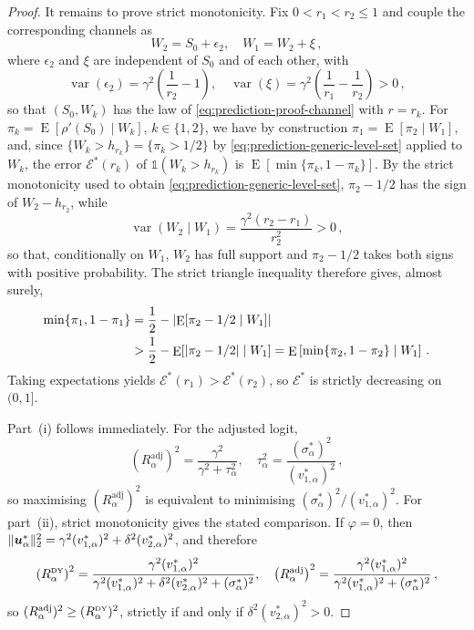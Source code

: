 \documentclass{article}
\makeatletter
\DeclareMathOperator{\expect}{E}
\DeclareMathOperator{\var}{var}
\theoremstyle{definition}
\newcommand{\vnorm}[1]{%
	\ensuremath{%
		\if@display
		\left\| #1 \right\|
		\else
		\| #1 \|
		\fi
	}%
}
\newcommand{\abs}[1]{%
	\ensuremath{%
		\if@display
		\left| #1 \right|
		\else
		\lvert #1 \rvert
		\fi
	}%
}
\newcommand*{\bb}{\boldsymbol}
\def\bu{\bb{u}}
\makeatother
\begin{document}
\begin{bibunit}
\begin{proof}
It remains to prove strict monotonicity. Fix $0<r_1<r_2\leq1$ and couple
the corresponding channels as
$$
    W_2=S_0+\epsilon_2,
    \quad
    W_1=W_2+\xi\,,
$$
where $\epsilon_2$ and $\xi$ are independent of $S_0$ and of each other,
with
$$
    \var(\epsilon_2)
    =
    \gamma^2\left(\frac1{r_2}-1\right),
    \quad
    \var(\xi)
    =
    \gamma^2\left(\frac1{r_1}-\frac1{r_2}\right)>0\,,
$$
so that $(S_0,W_k)$ has the law of \eqref{eq:prediction-proof-channel} with
$r=r_k$. For $\pi_k=\expect[\rho'(S_0)\mid W_k]$,
$k\in\{1,2\}$, we have by construction 
$\pi_1=\expect[\pi_2\mid W_1]$, and, since
$\{W_k>h_{r_k}\}=\{\pi_k>1/2\}$ by
\eqref{eq:prediction-generic-level-set} applied to $W_k$, the error
$\mathcal E^*(r_k)$ of $\mathds 1(W_k>h_{r_k})$ is
$\expect[\min\{\pi_k,1-\pi_k\}]$. By the strict monotonicity used to
obtain \eqref{eq:prediction-generic-level-set}, $\pi_2-1/2$ has the sign
of $W_2-h_{r_2}$, while
$$
    \var(W_2\mid W_1)
    =
    \frac{\gamma^2(r_2-r_1)}{r_2^2}>0\,,
$$
so that, conditionally on $W_1$, $W_2$ has full support and
$\pi_2-1/2$ takes both signs with positive probability. The strict
triangle inequality therefore gives, almost surely,
$$
\begin{aligned}
    \min\{\pi_1,1-\pi_1\}
    &=
    \frac12-\abs{\expect[\pi_2-1/2\mid W_1]}
    \\
    &>
    \frac12-\expect[\abs{\pi_2-1/2}\mid W_1]
    =
    \expect\left[\min\{\pi_2,1-\pi_2\}\mid W_1\right] \,.
\end{aligned}
$$
Taking expectations yields
$\mathcal E^*(r_1)>\mathcal E^*(r_2)$, so $\mathcal E^*$ is strictly
decreasing on $(0,1]$.

Part~(i) follows immediately. For the adjusted logit,
$$
    (R_\alpha^{\mathrm{adj}})^2
    =
    \frac{\gamma^2}{\gamma^2+\tau_\alpha^2},
    \quad
    \tau_\alpha^2
    =
    \frac{(\sigma_\alpha^*)^2}{(v_{1,\alpha}^*)^2}\,,
$$
so maximising $(R_\alpha^{\mathrm{adj}})^2$ is equivalent to minimising
$(\sigma_\alpha^*)^2/(v_{1,\alpha}^*)^2$.
For part~(ii), strict monotonicity gives the stated comparison. If
$\varphi=0$, then
$\vnorm{\bu_\alpha^*}_2^2
=\gamma^2(v_{1,\alpha}^*)^2+\delta^2(v_{2,\alpha}^*)^2$, and therefore
$$
    \left(R_\alpha^{\textrm{\tiny DY}}\right)^2
    =
    \frac{\gamma^2(v_{1,\alpha}^*)^2}{
        \gamma^2(v_{1,\alpha}^*)^2
        +\delta^2(v_{2,\alpha}^*)^2
        +(\sigma_\alpha^*)^2
    },
    \quad
    \left(R_\alpha^{\mathrm{adj}}\right)^2
    =
    \frac{\gamma^2(v_{1,\alpha}^*)^2}{
        \gamma^2(v_{1,\alpha}^*)^2
        +(\sigma_\alpha^*)^2
    }\,,
$$
so $(R_\alpha^{\mathrm{adj}})^2\geq(R_\alpha^{\textrm{\tiny DY}})^2$,
strictly if and only if $\delta^2(v_{2,\alpha}^*)^2>0$.
\end{proof}


\end{bibunit}
\end{document}
